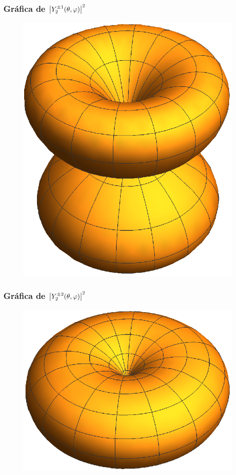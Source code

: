 \documentclass[12pt]{beamer}
\begin{document}
\begin{frame}
\frametitle{Gráfica de $\abs{Y_{2}^{\pm 1} (\theta, \varphi)}^{2}$}
\begin{figure}
    \centering
    \includegraphics[scale=0.75]{Imagenes/AE2_21.eps}
\end{figure}
\end{frame}
\begin{frame}
\frametitle{Gráfica de $\abs{Y_{2}^{\pm 2} (\theta, \varphi)}^{2}$}
\begin{figure}
    \centering
    \includegraphics[scale=0.8]{Imagenes/AE2_22.eps}
\end{figure}
\end{frame}
\end{document}
